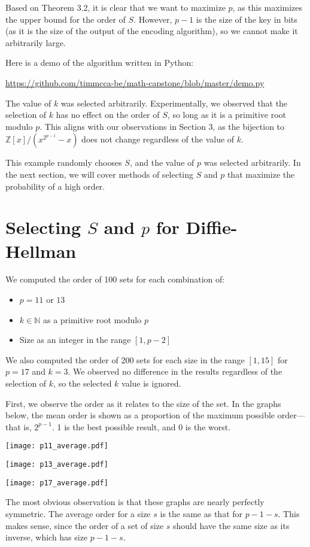 \documentclass{article}
\newcommand{\zee}{\mathbb{Z}}
\newcommand{\N}{\mathbb{N}}
\begin{document}
Based on Theorem 3.2, it is clear that we want to maximize $p$, as
this maximizes the upper bound for the order of $S$. However,
$p-1$ is the size of the key in bits (as it is the size of the
output of the encoding algorithm), so we cannot make it arbitrarily large.

Here is a demo of the algorithm written in Python:

\url{https://github.com/timmcca-be/math-capstone/blob/master/demo.py}

The value of $k$ was selected arbitrarily.
Experimentally, we observed that the selection of $k$
has no effect on the order of $S$, so long as it is a
primitive root modulo $p$. This aligns with our observations
in Section 3, as the bijection to $\zee[x]/(x^{2^{p-1}} - x)$
does not change regardless of the value of $k$.

This example randomly chooses $S$, and the value of $p$
was selected arbitrarily.
In the next section, we will cover
methods of selecting $S$ and $p$ that maximize the probability
of a high order.

\section{Selecting $S$ and $p$ for Diffie-Hellman}

We computed the order of 100 sets for each combination of:
\begin{itemize}
    \item $p = 11$ or $13$
    \item $k \in \N$ as a primitive root modulo $p$
    \item Size as an integer in the range $[1, p-2]$
\end{itemize}
We also computed the order of 200 sets for each size in the range
$[1, 15]$ for $p = 17$ and $k = 3$. We observed no difference in
the results regardless of the selection of $k$, so the selected
$k$ value is ignored.

First, we observe the order as it relates to the size of the set.
In the graphs below, the mean order is shown as a proportion of the
maximum possible order---that is, $2^{p-1}$. 1 is the best possible
result, and 0 is the worst.

\texttt{[image: p11\_average.pdf]}

\texttt{[image: p13\_average.pdf]}

\texttt{[image: p17\_average.pdf]}

The most obvious observation is that these graphs are nearly
perfectly symmetric. The average order for a size $s$
is the same as that for $p - 1 - s$.
This makes sense, since the order of a set of size
$s$ should have the same size as its inverse,
which has size $p - 1 - s$.
\end{document}
